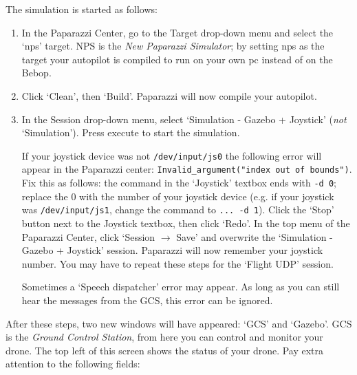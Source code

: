 \medskip

The simulation is started as follows:
\begin{enumerate}
	\item In the Paparazzi Center, go to the Target drop-down menu and select the `nps' target. NPS is the \emph{New Paparazzi Simulator}; by setting nps as the target your autopilot is compiled to run on your own pc instead of on the Bebop.
	\item Click `Clean', then `Build'. Paparazzi will now compile your autopilot.
	\item In the Session drop-down menu, select `Simulation - Gazebo + Joystick' (\emph{not} `Simulation'). Press execute to start the simulation.
	
	If your joystick device was not \verb"/dev/input/js0" the following error will appear in the Paparazzi center: \verb|Invalid_argument("index out of bounds")|. Fix this as follows: the command in the `Joystick' textbox ends with \verb"-d 0"; replace the 0 with the number of your joystick device (e.g. if your joystick was \verb"/dev/input/js1", change the command to \verb"... -d 1"). Click the `Stop' button next to the Joystick textbox, then click `Redo'. In the top menu of the Paparazzi Center, click `Session $\rightarrow$ Save' and overwrite the `Simulation - Gazebo + Joystick' session. Paparazzi will now remember your joystick number. You may have to repeat these steps for the `Flight UDP' session.
	
	Sometimes a `Speech dispatcher' error may appear. As long as you can still hear the messages from the GCS, this error can be ignored.
\end{enumerate}

After these steps, two new windows will have appeared: `GCS' and `Gazebo'.
GCS is the \emph{Ground Control Station}, from here you can control and monitor your drone.
The top left of this screen shows the status of your drone. Pay extra attention to the following fields:

